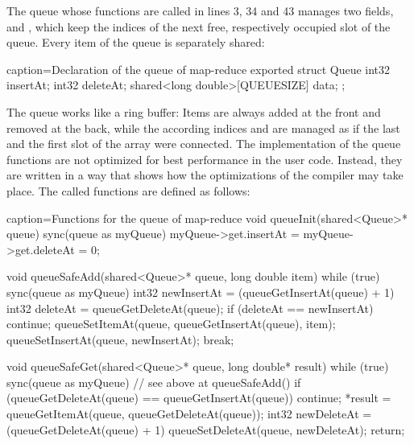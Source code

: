 The queue whose functions are called in lines 3, 34 and 43 manages two fields,  and , which keep the indices of the next free, respectively occupied slot of the queue. Every item of the queue is separately shared:
\begin{ccode}{caption=Declaration of the queue of map-reduce}
exported struct Queue { 
  int32 insertAt; 
  int32 deleteAt; 
  shared<long double>[QUEUESIZE] data; 
};
\end{ccode}
The queue works like a ring buffer: Items are always added at the front and removed at the back, while the according indices  and  are managed as if the last and the first slot of the array were connected. The implementation of the queue functions are not optimized for best performance in the user code. Instead, they are written in a way that shows how the optimizations of the compiler may take place. The called functions are defined as follows:

\begin{ccode}{caption=Functions for the queue of map-reduce}
void queueInit(shared<Queue>* queue) { 
  sync(queue as myQueue) { myQueue->get.insertAt = myQueue->get.deleteAt = 0; } 
}
 
void queueSafeAdd(shared<Queue>* queue, long double item) { 
  while (true) { 
    sync(queue as myQueue) {
      int32 newInsertAt = (queueGetInsertAt(queue) + 1) %
      int32 deleteAt = queueGetDeleteAt(queue); 
      if (deleteAt == newInsertAt) { continue; }
      queueSetItemAt(queue, queueGetInsertAt(queue), item); 
      queueSetInsertAt(queue, newInsertAt); 
      break; 
    } 
  }
}

void queueSafeGet(shared<Queue>* queue, long double* result) { 
  while (true) { 
    sync(queue as myQueue) { 
      // see above at queueSafeAdd() 
      if (queueGetDeleteAt(queue) == queueGetInsertAt(queue)) { continue; }
      *result = queueGetItemAt(queue, queueGetDeleteAt(queue)); 
      int32 newDeleteAt = (queueGetDeleteAt(queue) + 1) %
      queueSetDeleteAt(queue, newDeleteAt); 
      return; 
    } 
  } 
}
\end{ccode}

